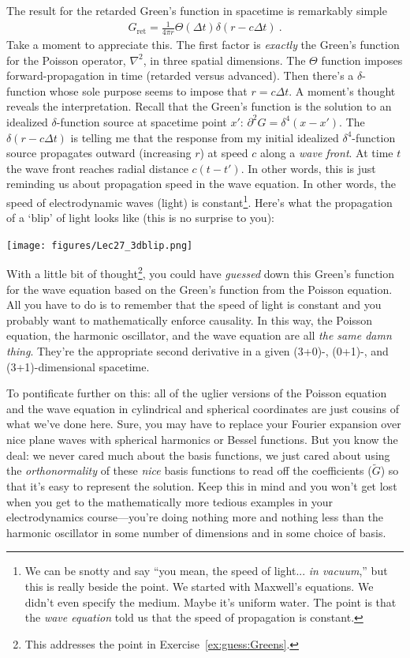 The result for the retarded Green's function in spacetime is remarkably simple
\begin{align}
	G_\text{ret} = \frac{1}{4\pi r} \Theta(\Delta t) \delta(r-c\Delta t) \ .
\end{align}
Take a moment to appreciate this. The first factor is \emph{exactly} the Green's function for the Poisson operator, $\nabla^2$, in three spatial dimensions. The $\Theta$ function imposes forward-propagation in time (retarded versus advanced). Then there's a $\delta$-function whose sole purpose seems to impose that $r = c\Delta t$. A moment's thought reveals the interpretation. Recall that the Green's function is the solution to an idealized $\delta$-function source at spacetime point $x'$: $\partial^2 G = \delta^4(x-x')$. The $\delta(r-c\Delta t)$ is telling me that the response from my initial idealized $\delta^4$-function source propagates outward (increasing $r$) at speed $c$ along a \emph{wave front}. At time $t$ the wave front reaches radial distance $c(t-t')$. In other words, this is just reminding us about propagation speed in the wave equation. In other words, the speed of electrodynamic waves (light) is constant\footnote{We can be snotty and say ``you mean, the speed of light... \emph{in vacuum},'' but this is really beside the point. We started with Maxwell's equations. We didn't even specify the medium. Maybe it's uniform water. The point is that the \emph{wave equation} told us that the speed of propagation is constant.}. Here's what the propagation of a `blip' of light looks like (this is no surprise to you):
\begin{center}
\texttt{[image: figures/Lec27\_3dblip.png]}
\end{center}

With a little bit of thought\footnote{This addresses the point in Exercise~\ref{ex:guess:Greens}.}, you could have \emph{guessed} down this Green's function for the wave equation based on the Green's function from the Poisson equation. All you have to do is to remember that the speed of light is constant and you probably want to mathematically enforce causality. In this way, the Poisson equation, the harmonic oscillator, and the wave equation are all \emph{the same damn thing}. They're the appropriate second derivative in a given (3+0)-, (0+1)-, and (3+1)-dimensional spacetime.

To pontificate further on this: all of the uglier versions of the Poisson equation and the wave equation in cylindrical and spherical coordinates are just cousins of what we've done here. Sure, you may have to replace your Fourier expansion over nice plane waves with spherical harmonics or Bessel functions. But you know the deal: we never cared much about the basis functions, we just cared about using the \emph{orthonormality} of these \emph{nice} basis functions to read off the coefficients ($\tilde G$) so that it's easy to represent the solution. Keep this in mind and you won't get lost when you get to the mathematically more tedious examples in your electrodynamics course---you're doing nothing more and nothing less than the harmonic oscillator in some number of dimensions and in some choice of basis.

